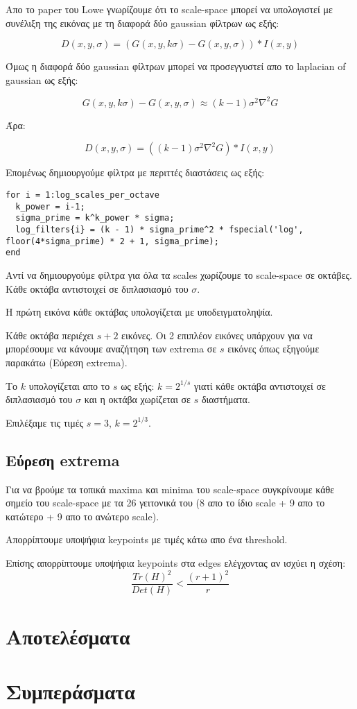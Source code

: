 \documentclass[11pt]{scrartcl} %
\begin{document}
Απο το paper του Lowe γνωρίζουμε ότι το scale-space μπορεί να υπολογιστεί με συνέλιξη της εικόνας με τη διαφορά δύο gaussian φίλτρων ως εξής:

\[D(x,y,\sigma) = (G(x,y,k\sigma) − G(x,y,\sigma)) * I(x,y)\]

Όμως η διαφορά δύο gaussian φίλτρων μπορεί να προσεγγυστεί απο το laplacian of gaussian ως εξής:

\[G(x,y,k\sigma) − G(x,y,\sigma) \approx (k−1)\sigma^2 \nabla^2 G\]

Άρα:

\[D(x,y,\sigma) = ((k−1)\sigma^2 \nabla^2 G) * I(x,y)\]

Επομένως δημιουργούμε φίλτρα με περιττές διαστάσεις ως εξής:

\begin{verbatim}
for i = 1:log_scales_per_octave
  k_power = i-1;
  sigma_prime = k^k_power * sigma;
  log_filters{i} = (k - 1) * sigma_prime^2 * fspecial('log', floor(4*sigma_prime) * 2 + 1, sigma_prime);
end
\end{verbatim}

Αντί να δημιουργούμε φίλτρα για όλα τα scales χωρίζουμε το scale-space σε οκτάβες.
Κάθε οκτάβα αντιστοιχεί σε διπλασιασμό του $\sigma$.

Η πρώτη εικόνα κάθε οκτάβας υπολογίζεται με υποδειγματοληψία.

Κάθε οκτάβα περιέχει $s+2$ εικόνες.
Οι 2 επιπλέον εικόνες υπάρχουν για να μπορέσουμε να κάνουμε αναζήτηση των extrema σε $s$ εικόνες όπως εξηγούμε παρακάτω (Εύρεση extrema).

Το $k$ υπολογίζεται απο το $s$ ως εξής: $k = 2^{1/s}$ γιατί κάθε οκτάβα αντιστοιχεί σε διπλασιασμό του $\sigma$ και η οκτάβα χωρίζεται σε $s$ διαστήματα.

Επιλέξαμε τις τιμές $s = 3$, $k = 2^{1/3}$.

\subsection{Εύρεση extrema}

Για να βρούμε τα τοπικά maxima και minima του scale-space συγκρίνουμε κάθε σημείο του scale-space με τα 26 γειτονικά του (8 απο το ίδιο scale + 9 απο το κατώτερο + 9 απο το ανώτερο scale).

Απορρίπτουμε υποψήφια keypoints με τιμές κάτω απο ένα threshold.

Επίσης απορρίπτουμε υποψήφια keypoints στα edges ελέγχοντας αν ισχύει η σχέση:
\[\frac{Tr(H)^2}{Det(H)} < \frac{(r+1)^2}{r}\]

\section{Αποτελέσματα}

\section{Συμπεράσματα}
\end{document}
